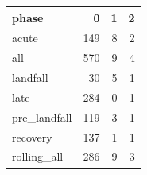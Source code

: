 \begin{tabular}{lrrr}
\toprule
phase & 0 & 1 & 2 \\
\midrule
acute & 149 & 8 & 2 \\
all & 570 & 9 & 4 \\
landfall & 30 & 5 & 1 \\
late & 284 & 0 & 1 \\
pre_landfall & 119 & 3 & 1 \\
recovery & 137 & 1 & 1 \\
rolling_all & 286 & 9 & 3 \\
\bottomrule
\end{tabular}
